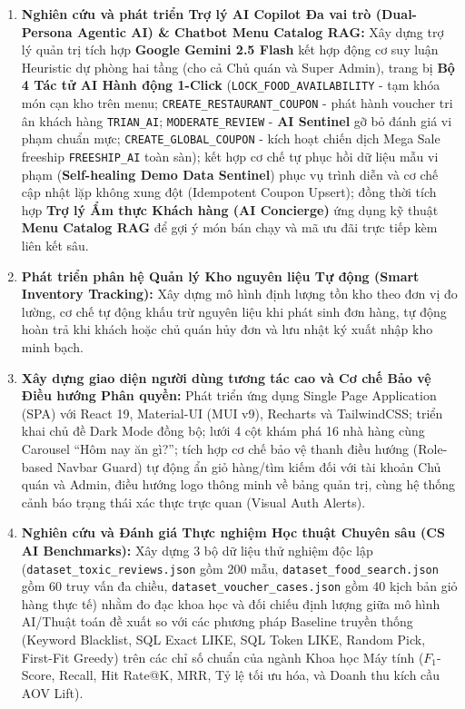 \documentclass{uetgraduation}
\begin{document}
\begin{enumerate}
    \item \textbf{Nghiên cứu và phát triển Trợ lý AI Copilot Đa vai trò (Dual-Persona Agentic AI) \& Chatbot Menu Catalog RAG:} Xây dựng trợ lý quản trị tích hợp \textbf{Google Gemini 2.5 Flash} kết hợp động cơ suy luận Heuristic dự phòng hai tầng (cho cả Chủ quán và Super Admin), trang bị \textbf{Bộ 4 Tác tử AI Hành động 1-Click} (\texttt{LOCK\_FOOD\_AVAILABILITY} - tạm khóa món cạn kho trên menu; \texttt{CREATE\_RESTAURANT\_COUPON} - phát hành voucher tri ân khách hàng \texttt{TRIAN\_AI}; \texttt{MODERATE\_REVIEW} - \textbf{AI Sentinel} gỡ bỏ đánh giá vi phạm chuẩn mực; \texttt{CREATE\_GLOBAL\_COUPON} - kích hoạt chiến dịch Mega Sale freeship \texttt{FREESHIP\_AI} toàn sàn); kết hợp cơ chế tự phục hồi dữ liệu mẫu vi phạm (\textbf{Self-healing Demo Data Sentinel}) phục vụ trình diễn và cơ chế cập nhật lặp không xung đột (Idempotent Coupon Upsert); đồng thời tích hợp \textbf{Trợ lý Ẩm thực Khách hàng (AI Concierge)} ứng dụng kỹ thuật \textbf{Menu Catalog RAG} để gợi ý món bán chạy và mã ưu đãi trực tiếp kèm liên kết sâu.
    \item \textbf{Phát triển phân hệ Quản lý Kho nguyên liệu Tự động (Smart Inventory Tracking):} Xây dựng mô hình định lượng tồn kho theo đơn vị đo lường, cơ chế tự động khấu trừ nguyên liệu khi phát sinh đơn hàng, tự động hoàn trả khi khách hoặc chủ quán hủy đơn và lưu nhật ký xuất nhập kho minh bạch.
    \item \textbf{Xây dựng giao diện người dùng tương tác cao và Cơ chế Bảo vệ Điều hướng Phân quyền:} Phát triển ứng dụng Single Page Application (SPA) với React 19, Material-UI (MUI v9), Recharts và TailwindCSS; triển khai chủ đề Dark Mode đồng bộ; lưới 4 cột khám phá 16 nhà hàng cùng Carousel ``Hôm nay ăn gì?''; tích hợp cơ chế bảo vệ thanh điều hướng (Role-based Navbar Guard) tự động ẩn giỏ hàng/tìm kiếm đối với tài khoản Chủ quán và Admin, điều hướng logo thông minh về bảng quản trị, cùng hệ thống cảnh báo trạng thái xác thực trực quan (Visual Auth Alerts).
    \item \textbf{Nghiên cứu và Đánh giá Thực nghiệm Học thuật Chuyên sâu (CS AI Benchmarks):} Xây dựng 3 bộ dữ liệu thử nghiệm độc lập (\texttt{dataset\_toxic\_reviews.json} gồm 200 mẫu, \texttt{dataset\_food\_search.json} gồm 60 truy vấn đa chiều, \texttt{dataset\_voucher\_cases.json} gồm 40 kịch bản giỏ hàng thực tế) nhằm đo đạc khoa học và đối chiếu định lượng giữa mô hình AI/Thuật toán đề xuất so với các phương pháp Baseline truyền thống (Keyword Blacklist, SQL Exact LIKE, SQL Token LIKE, Random Pick, First-Fit Greedy) trên các chỉ số chuẩn của ngành Khoa học Máy tính ($F_1$-Score, Recall, Hit Rate@K, MRR, Tỷ lệ tối ưu hóa, và Doanh thu kích cầu AOV Lift).
\end{enumerate}
\end{document}
